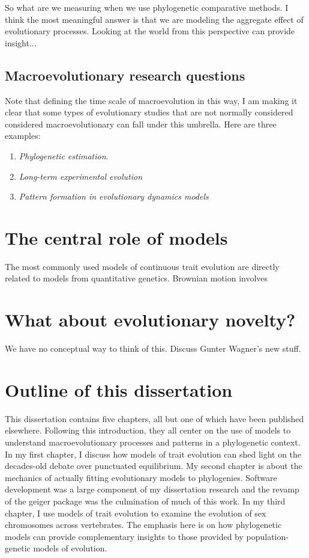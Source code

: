 So what are we measuring when we use phylogenetic comparative methods. I think the most meaningful answer is that we are modeling the aggregate effect of evolutionary processes. Looking at the world from this perspective can provide insight...

\subsection{Macroevolutionary research questions}

Note that defining the time scale of macroevolution in this way, I am making it clear that some types of evolutionary studies that are not normally considered considered macroevolutionary can fall under this umbrella. Here are three examples:
\begin{enumerate}
\item \emph{Phylogenetic estimation}.
\item \emph{Long-term experimental evolution}
\item \emph{Pattern formation in evolutionary dynamics models}
\end{enumerate}




\section{The central role of models}

The most commonly used models of continuous trait evolution are directly related to models from quantitative genetics. Brownian motion \citep[BM;][]{Edwards1964, Felsenstein1973, Thompson1975, Felsenstein1985} involves 

\section{What about evolutionary novelty?}

We have no conceptual way to think of this. Discuss Gunter Wagner's new stuff. 

\section{Outline of this dissertation}

This dissertation contains five chapters, all but one of which have been published elsewhere. Following this introduction, they all center on the use of models to understand macroevolutionary processes and patterns in a phylogenetic context. In my first chapter, I discuss how models of trait evolution can shed light on the decades-old debate over punctuated equilibrium. My second chapter is about the mechanics of actually fitting evolutionary models to phylogenies. Software development was a large component of my dissertation research and the revamp of the geiger package was the culmination of much of this work. In my third chapter, I use models of trait evolution to examine the evolution of sex chromosomes across vertebrates. The emphasis here is on how phylogenetic models can provide complementary insights to those provided by population-genetic models of evolution. 


